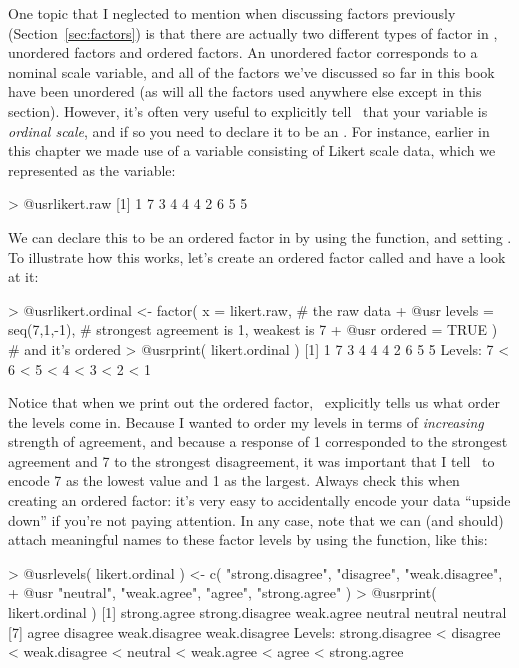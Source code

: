 
One topic that I neglected to mention when discussing factors previously (Section~\ref{sec:factors}) is that there are actually two different types of factor in \R, unordered factors and ordered factors. An unordered factor corresponds to a nominal scale variable, and all of the factors we've discussed so far in this book have been unordered (as will all the factors used anywhere else except in this section). However, it's often very useful to explicitly tell \R\ that your variable is {\it ordinal scale}, and if so you need to declare it to be an . For instance, earlier in this chapter we made use of a variable consisting of Likert scale data, which we represented as the  variable:
\begin{rblock1}
> @usr{likert.raw}
 [1] 1 7 3 4 4 4 2 6 5 5
\end{rblock1}
We can declare this to be an ordered factor in by using the  function, and setting . To illustrate how this works, let's create an ordered factor called  and have a look at it:
\begin{rblock1}
> @usr{likert.ordinal <- factor( x = likert.raw,}        # the raw data 
+ @usr{                          levels = seq(7,1,-1),}  # strongest agreement is 1, weakest is 7
+ @usr{                          ordered = TRUE )}       # and it's ordered
> @usr{print( likert.ordinal )}
 [1] 1 7 3 4 4 4 2 6 5 5
Levels: 7 < 6 < 5 < 4 < 3 < 2 < 1
\end{rblock1}
Notice that when we print out the ordered factor, \R\ explicitly tells us what order the levels come in. Because I wanted to order my levels in terms of {\it increasing} strength of agreement, and because a response of 1 corresponded to the strongest agreement and 7 to the strongest disagreement, it was important that I tell \R\ to encode 7 as the lowest value and 1 as the largest. Always check this when creating an ordered factor: it's very easy to accidentally encode your data ``upside down'' if you're not paying attention. In any case, note that we can (and should) attach meaningful names to these factor levels by using the  function, like this:
\begin{rblock1}
> @usr{levels( likert.ordinal ) <- c( "strong.disagree", "disagree", "weak.disagree", }
+ @usr{                               "neutral", "weak.agree", "agree", "strong.agree" )}
> @usr{print( likert.ordinal )}
 [1] strong.agree    strong.disagree weak.agree      neutral         neutral         neutral        
 [7] agree           disagree        weak.disagree   weak.disagree  
Levels: strong.disagree < disagree < weak.disagree < neutral < weak.agree < agree < strong.agree
\end{rblock1}
